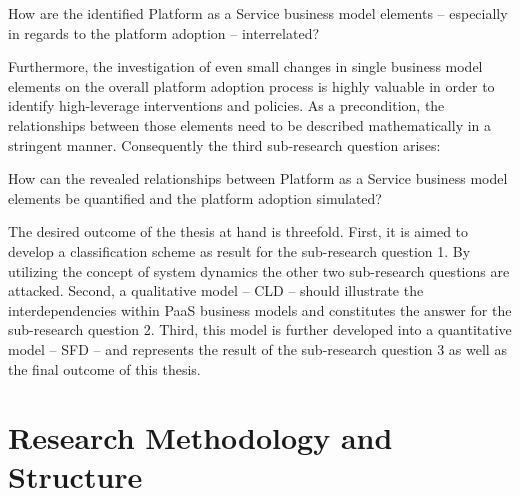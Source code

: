 \begin{SRQ}\label{srq2}
How are the identified Platform as a Service business model elements -- especially in regards to the platform adoption -- interrelated?
\end{SRQ}

Furthermore, the investigation of even small changes in single business model elements on the overall platform adoption process is highly valuable in order to identify high-leverage interventions and policies. As a precondition, the relationships between those elements need to be described mathematically in a stringent manner. Consequently the third sub-research question arises:

\begin{SRQ}\label{srq3}
How can the revealed relationships between Platform as a Service business model elements be quantified and the platform adoption simulated?
\end{SRQ}

The desired outcome of the thesis at hand is threefold. First, it is aimed to develop a classification scheme as result for the sub-research question 1. By utilizing the concept of system dynamics the other two sub-research questions are attacked. Second, a qualitative model -- \acf{CLD} -- should illustrate the interdependencies within \ac{PaaS} business models and constitutes the answer for the sub-research question 2. Third, this model is further developed into a quantitative model -- \acf{SFD} -- and represents the result of the sub-research question 3 as well as the final outcome of this thesis.
	
\section{Research Methodology and Structure}\label{ch:intro:met}

